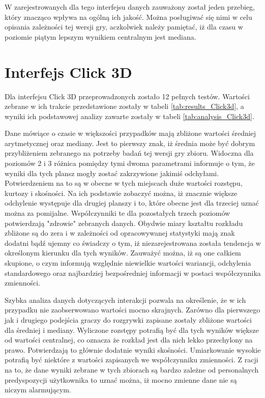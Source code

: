 \documentclass[a4paper,12pt,numbers=noenddot]{report}
\begin{document}
W zarejestrowanych dla tego interfejsu danych zauważony został jeden przebieg, który znacząco wpływa na ogólną ich jakość. Można posługiwać się nimi w celu opisania zależności tej wersji gry, aczkolwiek należy pamiętać, iż dla czasu w poziomie piątym lepszym wynikiem centralnym jest mediana.


\section{Interfejs Click 3D}%
Dla interfejsu Click 3D przeprowadzonych zostało 12 pełnych testów. Wartości zebrane w ich trakcie przedstawione zostały w tabeli \ref{tab:results_Click3d}, a wyniki ich podstawowej analizy zawarte zostały w tabeli \ref{tab:analysis_Click3d}.

Dane mówiące o czasie w większości przypadków mają zbliżone wartości średniej arytmetycznej oraz mediany. Jest to pierwszy znak, iż średnia może być dobrym przybliżeniem zebranego na potrzeby badań tej wersji gry zbioru. Widoczna dla poziomów 2 i 3 różnica pomiędzy tymi dwoma parametrami informuje o tym, że wyniki dla tych plansz mogły zostać zakrzywione jakimiś odchyłami. Potwierdzeniem na to są w obecne w tych miejscach duże wartości rozstępu, kurtozy i skośności. Na ich podstawie zobaczyć można, iż znacznie większe odchylenie występuje dla drugiej planszy i to, które obecne jest dla trzeciej uznać można za pomijalne. Współczynniki te dla pozostałych trzech poziomów potwierdzają "zdrowie" zebranych danych. Obydwie miary kształtu rozkładu zbliżone są do zera i w zależności od opracowywanej statystyki mają znak dodatni bądź ujemny co świadczy o tym, iż niezarejestrowana została tendencja w określonym kierunku dla tych wyników. Zauważyć można, iż są one całkiem skupione, o czym informują względnie niewielkie wartości wariancji, odchylenia standardowego oraz najbardziej bezpośredniej informacji w postaci współczynnika zmienności.

Szybka analiza danych dotyczących interakcji pozwala na określenie, że w ich przypadku nie zaobserwowano wartości mocno skrajnych. Zarówno dla pierwszego jak i drugiego podejścia graczy do rozgrywki zapisane zostały zbliżone wartości dla średniej i mediany. Wyliczone rozstępy potrafią być dla tych wyników większe od wartości centralnej, co oznacza że rozkład jest dla nich lekko przechylony na prawo. Potwierdzają to głównie dodatnie wyniki skośności. Umiarkowanie wysokie potrafią być niektóre z wartości zapisanych we współczynniku zmienności. Z racji na to, że dane wyniki zebrane w tych zbiorach są bardzo zależne od personalnych predyspozycji użytkownika to uznać można, iż mocno zmienne dane nie są niczym alarmującym.\\
\end{document}
